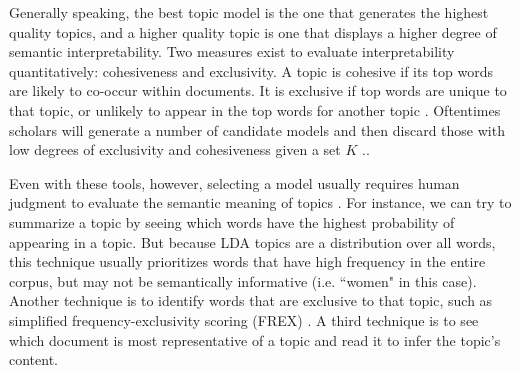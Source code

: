 \documentclass[11pt, oneside]{article}
\begin{document}
Generally speaking, the best topic model is the one that generates the highest quality topics, and a higher quality topic is one that displays a higher degree of semantic interpretability. Two measures exist to evaluate interpretability quantitatively: cohesiveness and exclusivity. A topic is cohesive if its top words are likely to co-occur within documents. It is exclusive if top words are unique to that topic, or unlikely to appear in the top words for another topic \cite[p.~6]{roberts2014}. Oftentimes scholars will generate a number of candidate models and then discard those with low degrees of exclusivity and cohesiveness given a set $K$ \cite{roberts2014}..

Even with these tools, however, selecting a model usually requires human judgment to evaluate the semantic meaning of topics \cite{mohr2013}. For instance, we can try to summarize a topic by seeing which words have the highest probability of appearing in a topic. But because LDA topics are a distribution over all words, this technique usually prioritizes words that have high frequency in the entire corpus, but may not be semantically informative (i.e. ``women" in this case). Another technique is to identify words that are exclusive to that topic, such as simplified frequency-exclusivity scoring (FREX) \cite[p. 5]{lucas2015computer}. A third technique is to see which document is most representative of a topic and read it to infer the topic's content.
\end{document}
